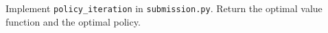\item {}

Implement \texttt{policy\_iteration} in \texttt{submission.py}. Return the optimal value function and the optimal policy.